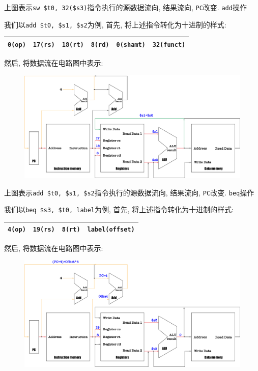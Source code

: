 \begin{enumerate}
\begin{figure}[H]
\end{figure}
上图表示\verb|sw $t0, 32($s3)|指令执行的\textcolor{myred}{源数据流向}, \textcolor{mygreen}{结果流向}, \textcolor{myyellow}{\texttt{PC}改变}.
\texttt{add}操作 \par
我们以\verb|add $t0, $s1, $s2|为例, 首先, 将上述指令转化为十进制的样式:
\begin{table}[H]
\centering
\begin{tabularx}{\textwidth}{|Z|Z|Z|Z|Z|Z|}
\hline
\verb|0(op)| & \verb|17(rs)| & \verb|18(rt)| & \verb|8(rd)| & \verb|0(shamt)| & \verb|32(funct)| \\
\hline
\end{tabularx}
\end{table}
然后, 将数据流在电路图中表示:
\begin{figure}[H]
\centering
\includegraphics[scale=.3]{img/figure28.pdf}
\end{figure}
上图表示\verb|add $t0, $s1, $s2|指令执行的\textcolor{myred}{源数据流向}, \textcolor{mygreen}{结果流向}, \textcolor{myyellow}{\texttt{PC}改变}.
\texttt{beq}操作 \par
我们以\verb|beq $s3, $t0, label|为例, 首先, 将上述指令转化为十进制的样式:
\begin{table}[H]
\centering
\begin{tabularx}{\textwidth}{|Z|Z|Z|Z|}
\hline
\verb|4(op)| & \verb|19(rs)| & \verb|8(rt)| & \verb|label(offset)| \\
\hline
\end{tabularx}
\end{table}
然后, 将数据流在电路图中表示:
\begin{figure}[H]
\centering
\includegraphics[scale=.3]{img/figure29.pdf}

\end{figure}
\end{enumerate}
